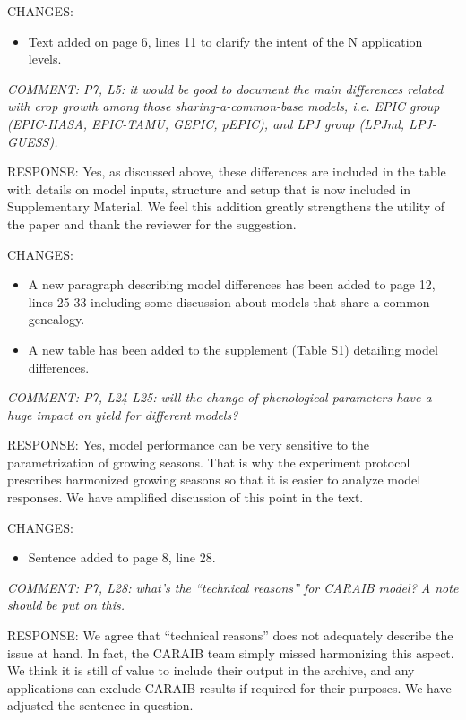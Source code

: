\documentclass[gmd, manuscript]{copernicus} %
\begin{document}
CHANGES:
\begin{itemize}
    \item Text added on page 6, lines 11 to clarify the intent of the N application levels.
\end{itemize}

\smallskip

\textcolor{dark-gray}{\textit{COMMENT: P7, L5: it would be good to document the main differences related with crop growth among those sharing-a-common-base models, i.e. EPIC group (EPIC-IIASA, EPIC-TAMU, GEPIC, pEPIC), and LPJ group (LPJml, LPJ-GUESS).}}

RESPONSE: Yes, as discussed above, these differences are included in the table with details on model inputs, structure and setup that is now included in Supplementary Material. We feel this addition greatly strengthens the utility of the paper and thank the reviewer for the suggestion.
\smallskip

CHANGES:
\begin{itemize}
    \item A new paragraph describing model differences has been added to page 12, lines 25-33 including some discussion about models that share a common genealogy.
    \item A new table has been added to the supplement (Table S1) detailing model differences.
\end{itemize}


\smallskip

\textcolor{dark-gray}{\textit{COMMENT: P7, L24-L25: will the change of phenological parameters have a huge impact on yield for different models?}}

RESPONSE: Yes, model performance can be very sensitive to the parametrization of growing seasons. That is why the experiment protocol prescribes harmonized growing seasons so that it is easier to analyze model responses. We have amplified discussion of this point in the text.
\smallskip

CHANGES:
\begin{itemize}
    \item Sentence added to page 8, line 28.
\end{itemize}

\smallskip

\textcolor{dark-gray}{\textit{COMMENT: P7, L28: what’s the “technical reasons” for CARAIB model? A note should be put on this.}}

RESPONSE: We agree that “technical reasons” does not adequately describe the issue at hand. In fact, the CARAIB team simply missed harmonizing this aspect. We think it is still of value to include their output in the archive, and any applications can exclude CARAIB results if required for their purposes. We have adjusted the sentence in question.
\smallskip
\end{document}
